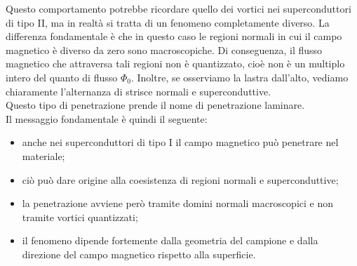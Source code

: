 Questo comportamento potrebbe ricordare quello dei vortici nei superconduttori di tipo II, ma in realtà si tratta di un fenomeno completamente diverso. La differenza fondamentale è che in questo caso le regioni normali in cui il campo magnetico è diverso da zero sono macroscopiche. Di conseguenza, il flusso magnetico che attraversa tali regioni non è quantizzato, cioè non è un multiplo intero del quanto di flusso $\Phi_0$. Inoltre, se osserviamo la lastra dall'alto, vediamo chiaramente l'alternanza di strisce normali e superconduttive.\\
Questo tipo di penetrazione prende il nome di penetrazione laminare.\\
Il messaggio fondamentale è quindi il seguente:
\begin{itemize}[leftmargin=0.5cm]
   \item anche nei superconduttori di tipo I il campo magnetico può penetrare nel materiale;
   \item ciò può dare origine alla coesistenza di regioni normali e superconduttive;
   \item la penetrazione avviene però tramite domini normali macroscopici e non tramite vortici quantizzati;
   \item il fenomeno dipende fortemente dalla geometria del campione e dalla direzione del campo magnetico rispetto alla superficie.
\end{itemize}
